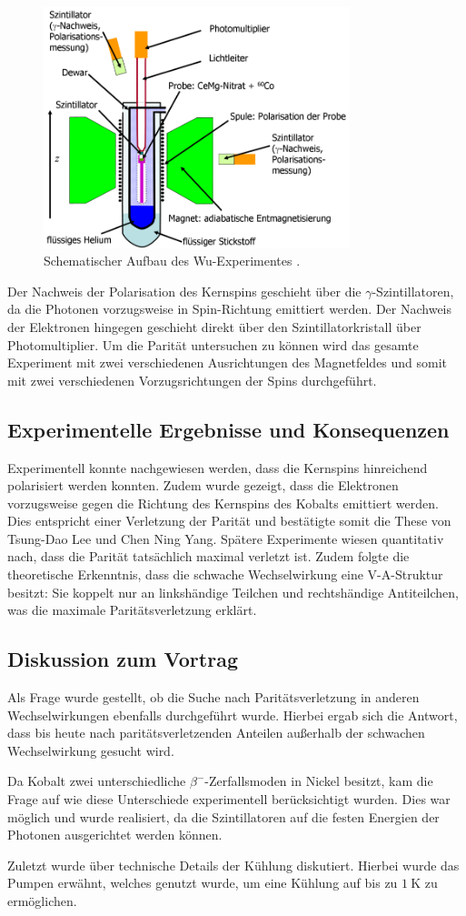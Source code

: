 \begin{figure}
  \centering
  \includegraphics[height=7.0cm]{ressources/wu.png}
  \caption{Schematischer Aufbau des Wu-Experimentes \cite{wu}.}
  \label{fig:wu}
\end{figure}

Der Nachweis der Polarisation des Kernspins geschieht über die $\gamma$-Szintillatoren, da die Photonen vorzugsweise in Spin-Richtung emittiert werden.
Der Nachweis der Elektronen hingegen geschieht direkt über den Szintillatorkristall über Photomultiplier.
Um die Parität untersuchen zu können wird das gesamte Experiment mit zwei verschiedenen Ausrichtungen des Magnetfeldes und somit mit zwei verschiedenen Vorzugsrichtungen der Spins durchgeführt.

\subsection{Experimentelle Ergebnisse und Konsequenzen}
Experimentell konnte nachgewiesen werden, dass die Kernspins hinreichend polarisiert werden konnten.
Zudem wurde gezeigt, dass die Elektronen vorzugsweise gegen die Richtung des Kernspins des Kobalts emittiert werden.
Dies entspricht einer Verletzung der Parität und bestätigte somit die These von Tsung-Dao Lee und Chen Ning Yang.
Spätere Experimente wiesen quantitativ nach, dass die Parität tatsächlich maximal verletzt ist.
Zudem folgte die theoretische Erkenntnis, dass die schwache Wechselwirkung eine V-A-Struktur besitzt:
Sie koppelt nur an linkshändige Teilchen und rechtshändige Antiteilchen, was die maximale Paritätsverletzung erklärt.

\subsection{Diskussion zum Vortrag}
Als Frage wurde gestellt, ob die Suche nach Paritätsverletzung in anderen Wechselwirkungen ebenfalls durchgeführt wurde.
Hierbei ergab sich die Antwort, dass bis heute nach paritätsverletzenden Anteilen außerhalb der schwachen Wechselwirkung gesucht wird.

Da Kobalt zwei unterschiedliche $\beta^-$-Zerfallsmoden in Nickel besitzt, kam die Frage auf wie diese Unterschiede experimentell berücksichtigt wurden.
Dies war möglich und wurde realisiert, da die Szintillatoren auf die festen Energien der Photonen ausgerichtet werden können.

Zuletzt wurde über technische Details der Kühlung diskutiert.
Hierbei wurde das Pumpen erwähnt, welches genutzt wurde, um eine Kühlung auf bis zu $\SI{1}{\kelvin}$ zu ermöglichen.
